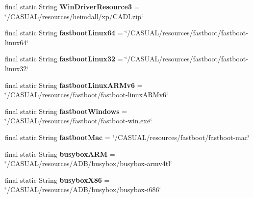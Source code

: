 \begin{DoxyCompactItemize}
\item 
\hypertarget{classCASUAL_1_1Statics_a52abf4602dd83dfac323bca785d4dca5}{final static String {\bfseries Win\-Driver\-Resource3} = \char`\"{}/C\-A\-S\-U\-A\-L/resources/heimdall/xp/C\-A\-D\-I.\-zip\char`\"{}}\label{classCASUAL_1_1Statics_a52abf4602dd83dfac323bca785d4dca5}

\item 
\hypertarget{classCASUAL_1_1Statics_a9b837da7b793e73b0e78c3e1274a52f3}{final static String {\bfseries fastboot\-Linux64} = \char`\"{}/C\-A\-S\-U\-A\-L/resources/fastboot/fastboot-\/linux64\char`\"{}}\label{classCASUAL_1_1Statics_a9b837da7b793e73b0e78c3e1274a52f3}

\item 
\hypertarget{classCASUAL_1_1Statics_afb2bad8f005c7553dcc5b560676c0ddb}{final static String {\bfseries fastboot\-Linux32} = \char`\"{}/C\-A\-S\-U\-A\-L/resources/fastboot/fastboot-\/linux32\char`\"{}}\label{classCASUAL_1_1Statics_afb2bad8f005c7553dcc5b560676c0ddb}

\item 
\hypertarget{classCASUAL_1_1Statics_aaec651082c506e90d581bbf2e801c340}{final static String {\bfseries fastboot\-Linux\-A\-R\-Mv6} = \char`\"{}/C\-A\-S\-U\-A\-L/resources/fastboot/fastboot-\/linux\-A\-R\-Mv6\char`\"{}}\label{classCASUAL_1_1Statics_aaec651082c506e90d581bbf2e801c340}

\item 
\hypertarget{classCASUAL_1_1Statics_a2308ed514be7606d96d63b9d473a2519}{final static String {\bfseries fastboot\-Windows} = \char`\"{}/C\-A\-S\-U\-A\-L/resources/fastboot/fastboot-\/win.\-exe\char`\"{}}\label{classCASUAL_1_1Statics_a2308ed514be7606d96d63b9d473a2519}

\item 
\hypertarget{classCASUAL_1_1Statics_af1459ee700e9b06ef0f0e231c615ebcb}{final static String {\bfseries fastboot\-Mac} = \char`\"{}/C\-A\-S\-U\-A\-L/resources/fastboot/fastboot-\/mac\char`\"{}}\label{classCASUAL_1_1Statics_af1459ee700e9b06ef0f0e231c615ebcb}

\item 
\hypertarget{classCASUAL_1_1Statics_ae47acf67c98af440a76e49aade09ebcf}{final static String {\bfseries busybox\-A\-R\-M} = \char`\"{}/C\-A\-S\-U\-A\-L/resources/A\-D\-B/busybox/busybox-\/armv4tl\char`\"{}}\label{classCASUAL_1_1Statics_ae47acf67c98af440a76e49aade09ebcf}

\item 
\hypertarget{classCASUAL_1_1Statics_aa30a56fdc7cf248eedc2c0a13025b58d}{final static String {\bfseries busybox\-X86} = \char`\"{}/C\-A\-S\-U\-A\-L/resources/A\-D\-B/busybox/busybox-\/i686\char`\"{}}\label{classCASUAL_1_1Statics_aa30a56fdc7cf248eedc2c0a13025b58d}


\end{DoxyCompactItemize}
